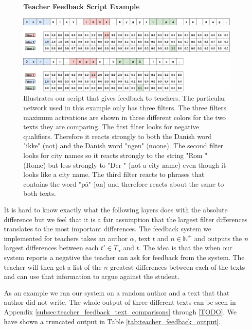 \begin{figure}
    \centering
    \textbf{Teacher Feedback Script Example}\par\medskip
    \includegraphics[width=\textwidth]{./pictures/discussion/teacher_feedback_example.png}
    \caption{Illustrates our script that gives feedback to teachers. The
        particular network used in this example only has three filters. The
        three filters maximum activations are shown in three different colors
        for the two texts they are comparing. The first filter looks for
        negative qualifiers. Therefore it reacts strongly to both the Danish
        word "ikke" (not) and the Danish word "ngen" (noone). The second filter
        looks for city names so it reacts strongly to the string "Rom " (Rome)
        but less strongly to "Der " (not a city name) even though it looks like
        a city name. The third filter reacts to phrases that contains the word
        "p\aa " (on) and therefore reacts about the same to both texts.}
    \label{fig:feature_extraction_output_example}
\end{figure}


It is hard to know exactly what the following layers does with the absolute
difference but we feel that it is a fair assumption that the largest filter
differences translates to the most important differences. The feedback system
we implemented for teachers takes an author $\alpha$, text $t$ and $n \in
\mathbb{N}^+$ and outputs the $n$ largest differences between each $t' \in
T_\alpha$ and $t$. The idea is that the when our system reports a negative the
teacher can ask for feedback from the system. The teacher will then get a list
of the $n$ greatest differences between each of the texts and can use that
information to argue against the student.

As an example we ran our system on a random author and a text that that author
did not write. The whole output of three different texts can be seen in Appendix
\ref{subsec:teacher_feedback_text_comparisons} through \ref{TODO}. We have shown
a truncated output in Table \ref{tab:teacher_feedback_output}.

